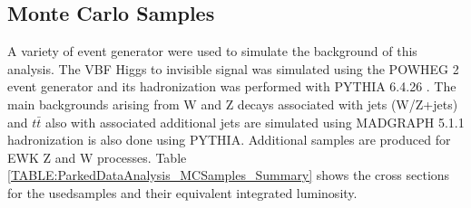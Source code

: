 \subsection{Monte Carlo Samples}


A variety of event generator were used to simulate the background of this analysis. The \gls{VBF} Higgs to invisible signal was simulated using the \textsc{POWHEG} 2 event generator \cite{ARTICLE:POWHEG_2004,ARTICLE:POWHEG_2007,ARTICLE:POWHEG_2009v1,ARTICLE:POWHEG_2009v2,ARTICLE:POWHEG_2010v1,ARTICLE:POWHEG_2010v2,ARTICLE:POWHEG_2011v1,ARTICLE:POWHEG_2011v2} and its hadronization was performed with \textsc{PYTHIA} 6.4.26 \cite{ARTICLE:Pythia6p4PhysicsAndManual}. The main backgrounds arising from W and Z decays associated with jets (W/Z+jets) and $t\bar{t}$ also with associated additional jets are simulated using \textsc{MADGRAPH} 5.1.1 \cite{ARTICLE:MadGraph5,ARTICLE:aMCatNLO} hadronization is also done using \textsc{PYTHIA}. Additional samples are produced for \gls{EWK} Z and W processes. Table \ref{TABLE:ParkedDataAnalysis_MCSamples_Summary} shows the cross sections for the usedsamples and their equivalent integrated luminosity.

